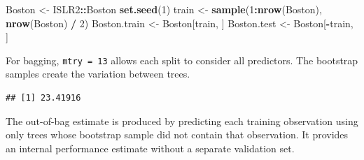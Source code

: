 \documentclass[
  11pt,
]{article}
\newenvironment{Shaded}{\begin{snugshade}}{\end{snugshade}}
\newcommand{\AttributeTok}[1]{\textcolor[rgb]{0.13,0.29,0.53}{#1}}
\newcommand{\ConstantTok}[1]{\textcolor[rgb]{0.56,0.35,0.01}{#1}}
\newcommand{\DecValTok}[1]{\textcolor[rgb]{0.00,0.00,0.81}{#1}}
\newcommand{\FunctionTok}[1]{\textcolor[rgb]{0.13,0.29,0.53}{\textbf{#1}}}
\newcommand{\NormalTok}[1]{#1}
\newcommand{\OtherTok}[1]{\textcolor[rgb]{0.56,0.35,0.01}{#1}}
\newcommand{\SpecialCharTok}[1]{\textcolor[rgb]{0.81,0.36,0.00}{\textbf{#1}}}
\begin{document}
\begin{Shaded}
\begin{Highlighting}[]
\NormalTok{Boston }\OtherTok{\textless{}{-}}\NormalTok{ ISLR2}\SpecialCharTok{::}\NormalTok{Boston}
\FunctionTok{set.seed}\NormalTok{(}\DecValTok{1}\NormalTok{)}
\NormalTok{train }\OtherTok{\textless{}{-}} \FunctionTok{sample}\NormalTok{(}\DecValTok{1}\SpecialCharTok{:}\FunctionTok{nrow}\NormalTok{(Boston), }\FunctionTok{nrow}\NormalTok{(Boston) }\SpecialCharTok{/} \DecValTok{2}\NormalTok{)}
\NormalTok{Boston.train }\OtherTok{\textless{}{-}}\NormalTok{ Boston[train, ]}
\NormalTok{Boston.test }\OtherTok{\textless{}{-}}\NormalTok{ Boston[}\SpecialCharTok{{-}}\NormalTok{train, ]}
\end{Highlighting}
\end{Shaded}

For bagging, \texttt{mtry\ =\ 13} allows each split to consider all
predictors. The bootstrap samples create the variation between trees.

\begin{Shaded}
\end{Shaded}

\begin{verbatim}
## [1] 23.41916
\end{verbatim}

The out-of-bag estimate is produced by predicting each training
observation using only trees whose bootstrap sample did not contain that
observation. It provides an internal performance estimate without a
separate validation set.

\begin{Shaded}
\end{Shaded}
\end{document}
